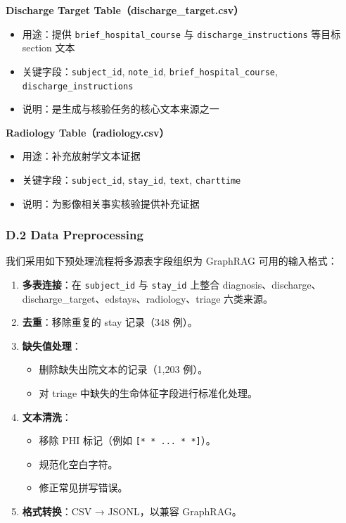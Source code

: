 \documentclass[11pt]{article}
\providecommand{\tightlist}{\setlength{\itemsep}{0pt}\setlength{\parskip}{0pt}}
\begin{document}
\textbf{Discharge Target Table（discharge\_target.csv）}

\begin{itemize}
\tightlist
\item
  用途：提供 \texttt{brief\_hospital\_course} 与 \texttt{discharge\_instructions} 等目标 section 文本
\item
  关键字段：\texttt{subject\_id}, \texttt{note\_id}, \texttt{brief\_hospital\_course}, \texttt{discharge\_instructions}
\item
  说明：是生成与核验任务的核心文本来源之一
\end{itemize}

\textbf{Radiology Table（radiology.csv）}

\begin{itemize}
\tightlist
\item
  用途：补充放射学文本证据
\item
  关键字段：\texttt{subject\_id}, \texttt{stay\_id}, \texttt{text}, \texttt{charttime}
\item
  说明：为影像相关事实核验提供补充证据
\end{itemize}

\subsubsection{D.2 Data Preprocessing}

我们采用如下预处理流程将多源表字段组织为 GraphRAG 可用的输入格式：

\begin{enumerate}
\def\labelenumi{\arabic{enumi}.}
\tightlist
\item
  \textbf{多表连接}：在 \texttt{subject\_id} 与 \texttt{stay\_id} 上整合 diagnosis、discharge、discharge\_target、edstays、radiology、triage 六类来源。
\item
  \textbf{去重}：移除重复的 stay 记录（348 例）。
\item
  \textbf{缺失值处理}：

  \begin{itemize}
  \tightlist
  \item
    删除缺失出院文本的记录（1,203 例）。
  \item
    对 triage 中缺失的生命体征字段进行标准化处理。
  \end{itemize}
\item
  \textbf{文本清洗}：

  \begin{itemize}
  \tightlist
  \item
    移除 PHI 标记（例如 \texttt{{[}*\ *\ ...\ *\ *{]}}）。
  \item
    规范化空白字符。
  \item
    修正常见拼写错误。
  \end{itemize}
\item
  \textbf{格式转换}：CSV → JSONL，以兼容 GraphRAG。
\end{enumerate}
\end{document}
